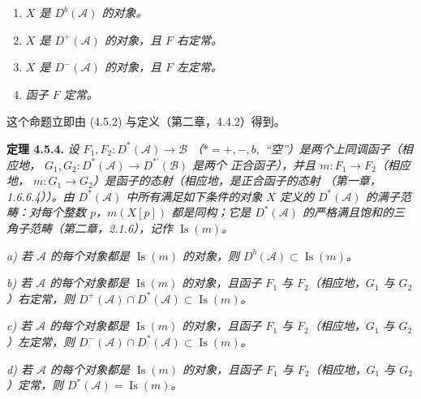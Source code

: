 \clearpage
{}%
\begingroup\small\setlength{\parskip}{0pt}\setlength{\emergencystretch}{1.5em}
\setlength{\abovedisplayskip}{4pt plus 2pt minus 2pt}%
\setlength{\belowdisplayskip}{4pt plus 2pt minus 2pt}%

\begin{enumerate}
\item[1)] \textit{$X$ 是 $D^b(\mathcal A)$ 的对象。}
\item[2)] \textit{$X$ 是 $D^+(\mathcal A)$ 的对象，且 $F$ 右定常。}
\item[3)] \textit{$X$ 是 $D^-(\mathcal A)$ 的对象，且 $F$ 左定常。}
\item[4)] \textit{函子 $F$ 定常。}
\end{enumerate}

这个命题立即由 (4.5.2) 与定义（第二章，4.4.2）得到。

\medskip\noindent\textbf{定理 4.5.4.}\quad
\textit{设
$F_1,F_2\colon D^*(\mathcal A)\longrightarrow\mathcal B$
（$*=+,-,b,{}$ ``空''）是两个上同调函子（相应地，
$G_1,G_2\colon D^*(\mathcal A)\longrightarrow D^{*'}(\mathcal B)$ 是两个
正合函子），并且 $m\colon F_1\longrightarrow F_2$（相应地，
$m\colon G_1\longrightarrow G_2$）是函子的态射（相应地，是正合函子的态射
（第一章，1.6.6.4））。由 $D^*(\mathcal A)$ 中所有满足如下条件的对象
$X$ 定义的 $D^*(\mathcal A)$ 的满子范畴：对每个整数 $p$，$m(X[p])$
都是同构；它是
$D^*(\mathcal A)$ 的严格满且饱和的三角子范畴（第二章，2.1.6），记作
$\operatorname{Is}(m)$。}

\noindent\textit{a) 若 $\mathcal A$ 的每个对象都是
$\operatorname{Is}(m)$ 的对象，则
$D^b(\mathcal A)\subset\operatorname{Is}(m)$。}

\noindent\textit{b) 若 $\mathcal A$ 的每个对象都是
$\operatorname{Is}(m)$ 的对象，且函子 $F_1$ 与 $F_2$（相应地，$G_1$ 与
$G_2$）右定常，则
$D^+(\mathcal A)\cap D^*(\mathcal A)\subset\operatorname{Is}(m)$。}

\noindent\textit{c) 若 $\mathcal A$ 的每个对象都是
$\operatorname{Is}(m)$ 的对象，且函子 $F_1$ 与 $F_2$（相应地，$G_1$ 与
$G_2$）左定常，则
$D^-(\mathcal A)\cap D^*(\mathcal A)\subset\operatorname{Is}(m)$。}

\noindent\textit{d) 若 $\mathcal A$ 的每个对象都是
$\operatorname{Is}(m)$ 的对象，且函子 $F_1$ 与 $F_2$（相应地，$G_1$ 与
$G_2$）定常，则
$D^*(\mathcal A)=\operatorname{Is}(m)$。}

